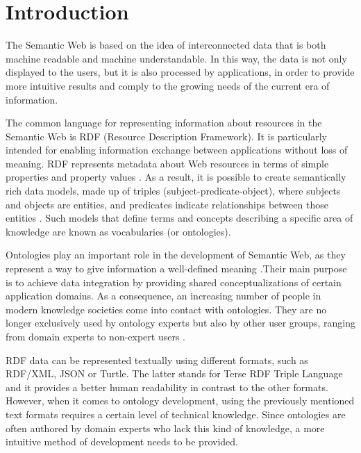 \chapter{Introduction}
\label{ch:introduction}






The Semantic Web is based on the idea of interconnected data that is both machine readable and machine understandable. In this way, the data is not only displayed to the users, but it is also processed by applications, in order to provide more intuitive results and comply to the growing needs of the current era of information.

The common language for representing information about resources in the Semantic Web is RDF (Resource Description Framework). It is particularly intended for enabling information exchange between applications without loss of meaning. RDF represents metadata about Web resources in terms of simple properties and property values \cite{Manola2004}. As a result, it is possible to create semantically rich data models, made up of triples (subject-predicate-object), where subjects and objects are entities, and predicates indicate relationships between those entities \cite{Mutton2003}. Such models that define terms and concepts describing a specific area of knowledge are known as vocabularies (or ontologies).

Ontologies play an important role in the development of Semantic Web, as they represent a way to give information a well-defined meaning \cite{Berners-Lee2001}.Their main purpose is to achieve data integration by providing shared conceptualizations of certain application domains. As a consequence, an increasing number of people in modern knowledge societies come into contact with ontologies. They are no longer exclusively used by ontology experts but also by other user groups, ranging from domain experts to non-expert users \cite{Lohmann2015}.

RDF data can be represented textually using different formats, such as RDF/XML, JSON or Turtle. The latter stands for Terse RDF Triple Language \cite{Beckett2014} and it provides a better human readability in contrast to the other formats. However, when it comes to ontology development, using the previously mentioned text formats requires a certain level of technical knowledge. Since ontologies are often authored by domain experts who lack this kind of knowledge, a more intuitive method of development needs to be provided.

